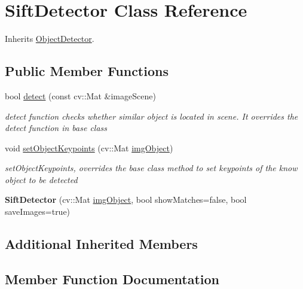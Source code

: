 \hypertarget{class_sift_detector}{}\section{Sift\+Detector Class Reference}
\label{class_sift_detector}


Inherits \hyperlink{class_object_detector}{Object\+Detector}.

\subsection*{Public Member Functions}
\begin{DoxyCompactItemize}
\item 
bool \hyperlink{class_sift_detector_a1a4d71d935e936fff28a75bf542e1d11}{detect} (const cv\+::\+Mat \&image\+Scene)
\begin{DoxyCompactList}\small\item\em detect function checks whether similar object is located in scene. It overrides the detect function in base class \end{DoxyCompactList}\item 
void \hyperlink{class_sift_detector_ae8da1b225d306360f5ca309dfc2a5442}{set\+Object\+Keypoints} (cv\+::\+Mat \hyperlink{class_object_detector_a61777cf5e76f8ba8e2d605b63c7bb2b3}{img\+Object})
\begin{DoxyCompactList}\small\item\em set\+Object\+Keypoints, overrides the base class method to set keypoints of the know object to be detected \end{DoxyCompactList}\item 
{\bfseries Sift\+Detector} (cv\+::\+Mat \hyperlink{class_object_detector_a61777cf5e76f8ba8e2d605b63c7bb2b3}{img\+Object}, bool show\+Matches=false, bool save\+Images=true)\hypertarget{class_sift_detector_a395b1956c911fa0b840f2a3fc353a422}{}\label{class_sift_detector_a395b1956c911fa0b840f2a3fc353a422}

\end{DoxyCompactItemize}
\subsection*{Additional Inherited Members}


\subsection{Member Function Documentation}
